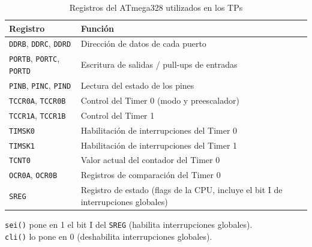 \begin{table}[H]
\centering
\begin{tabular}{lp{9cm}}
\toprule
\textbf{Registro} & \textbf{Función} \\
\midrule
\texttt{DDRB}, \texttt{DDRC}, \texttt{DDRD} & Dirección de datos de cada puerto \\
\texttt{PORTB}, \texttt{PORTC}, \texttt{PORTD} & Escritura de salidas / pull-ups de entradas \\
\texttt{PINB}, \texttt{PINC}, \texttt{PIND} & Lectura del estado de los pines \\
\texttt{TCCR0A}, \texttt{TCCR0B} & Control del Timer 0 (modo y preescalador) \\
\texttt{TCCR1A}, \texttt{TCCR1B} & Control del Timer 1 \\
\texttt{TIMSK0} & Habilitación de interrupciones del Timer 0 \\
\texttt{TIMSK1} & Habilitación de interrupciones del Timer 1 \\
\texttt{TCNT0} & Valor actual del contador del Timer 0 \\
\texttt{OCR0A}, \texttt{OCR0B} & Registros de comparación del Timer 0 \\
\texttt{SREG} & Registro de estado (flags de la CPU, incluye el bit I de interrupciones globales) \\
\bottomrule
\end{tabular}
\caption{Registros del ATmega328 utilizados en los TPs}
\end{table}

\begin{notabox}
\texttt{sei()} pone en 1 el bit I del \texttt{SREG} (habilita interrupciones globales).\\
\texttt{cli()} lo pone en 0 (deshabilita interrupciones globales).
\end{notabox}
